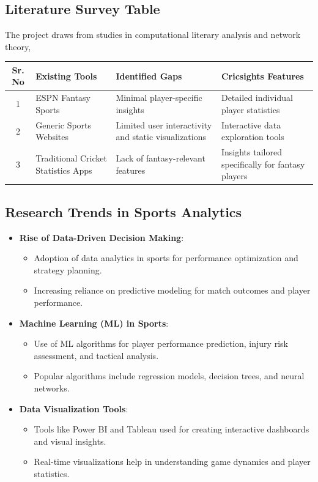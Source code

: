 \subsection{Literature Survey Table}
The project draws from studies in computational literary analysis and network theory, 
\begin{longtable}{|c|p{4cm}|p{6cm}|p{5cm}|}
    \hline
    \textbf{Sr. No} & \textbf{Existing Tools} & \textbf{Identified Gaps} & \textbf{Cricsights Features} \\ \hline
    1 & ESPN Fantasy Sports
     & Minimal player-specific insights & Detailed individual player statistics \\ \hline
    2 & Generic Sports Websites  & Limited user interactivity and static visualizations & Interactive data exploration tools \\ \hline
    3 & Traditional Cricket Statistics Apps  & Lack of fantasy-relevant features & Insights tailored specifically for fantasy players \\ \hline
   
\end{longtable}
\subsection{Research Trends in Sports Analytics}
\begin{itemize}
    \item \textbf{Rise of Data-Driven Decision Making}:
    \begin{itemize}
        \item Adoption of data analytics in sports for performance optimization and strategy planning.
        \item Increasing reliance on predictive modeling for match outcomes and player performance.
    \end{itemize}
    \item \textbf{Machine Learning (ML) in Sports}:
    \begin{itemize}
        \item Use of ML algorithms for player performance prediction, injury risk assessment, and tactical analysis.
        \item Popular algorithms include regression models, decision trees, and neural networks.
    \end{itemize}
    \item \textbf{Data Visualization Tools}:
    \begin{itemize}
        \item Tools like Power BI and Tableau used for creating interactive dashboards and visual insights.
        \item Real-time visualizations help in understanding game dynamics and player statistics.
    \end{itemize}
\end{itemize}

